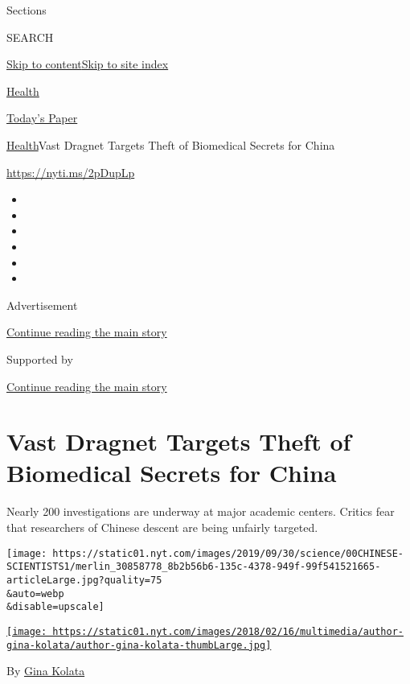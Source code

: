 Sections

SEARCH

\protect\hyperlink{site-content}{Skip to
content}\protect\hyperlink{site-index}{Skip to site index}

\href{https://www.nytimes.com/section/health}{Health}

\href{https://myaccount.nytimes.com/auth/login?response_type=cookie\&client_id=vi}{}

\href{https://www.nytimes.com/section/todayspaper}{Today's Paper}

\href{/section/health}{Health}\textbar{}Vast Dragnet Targets Theft of
Biomedical Secrets for China

\url{https://nyti.ms/2pDupLp}

\begin{itemize}
\item
\item
\item
\item
\item
\item
\end{itemize}

Advertisement

\protect\hyperlink{after-top}{Continue reading the main story}

Supported by

\protect\hyperlink{after-sponsor}{Continue reading the main story}

\hypertarget{vast-dragnet-targets-theft-of-biomedical-secrets-for-china}{%
\section{Vast Dragnet Targets Theft of Biomedical Secrets for
China}\label{vast-dragnet-targets-theft-of-biomedical-secrets-for-china}}

Nearly 200 investigations are underway at major academic centers.
Critics fear that researchers of Chinese descent are being unfairly
targeted.

\texttt{[image: https://static01.nyt.com/images/2019/09/30/science/00CHINESE-SCIENTISTS1/merlin\_30858778\_8b2b56b6-135c-4378-949f-99f541521665-articleLarge.jpg?quality=75\\\&auto=webp\\\&disable=upscale]}

\href{https://www.nytimes.com/by/gina-kolata}{\texttt{[image: https://static01.nyt.com/images/2018/02/16/multimedia/author-gina-kolata/author-gina-kolata-thumbLarge.jpg]}}

By \href{https://www.nytimes.com/by/gina-kolata}{Gina Kolata}


